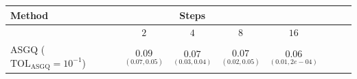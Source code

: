 %	
%	
%
%
%
\begin{table}[h!]
	\centering
	\begin{tabular}{l*{6}{c}r}
	\toprule[1.5pt]
	Method & & Steps  & &     \\
	\hline	
		         & $2$ & $4$ & $8$ & $16$  \\
		\hline

		ASGQ ($\text{TOL}_{\text{ASGQ}}=10^{-1}$)  & $\underset{(0.07,0.05)}{\mathbf{0.09}}$ & $\underset{(0.03,0.04)}{\mathbf{0.07}}$& $\underset{(0.02,0.05)}{\mathbf{ 0.07}}$ & $\underset{(0.01,2e-04)}{\mathbf{ 0.06}}$   \\


\end{tabular}
\end{table}
